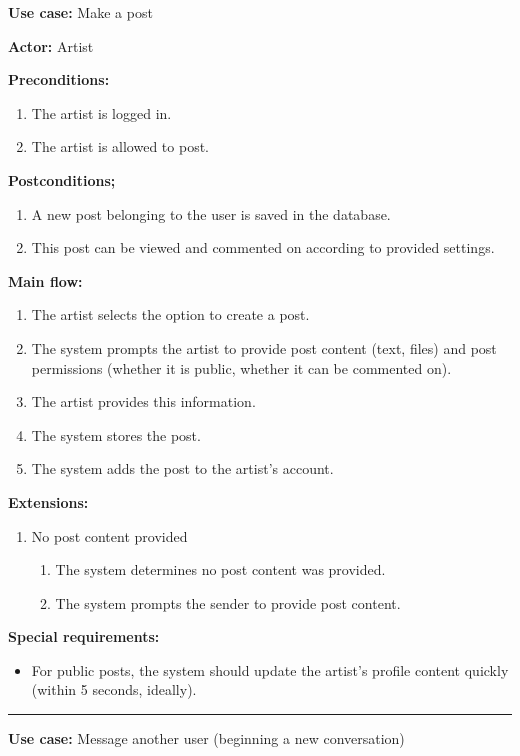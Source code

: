 \documentclass{article}
\begin{document}
{\bfseries Use case:} Make a post

{\bfseries Actor:} Artist

{\bfseries Preconditions:}
\begin{enumerate}
	\item The artist is logged in.
	\item The artist is allowed to post.
\end{enumerate}

{\bfseries Postconditions;}
\begin{enumerate}
	\item A new post belonging to the user is saved in the database.
	\item This post can be viewed and commented on according to provided settings.
\end{enumerate}

{\bfseries Main flow:}
\begin{enumerate}
	\item The artist selects the option to create a post.
	\item The system prompts the artist to provide post content (text, files) and post permissions (whether it is public, whether it can be commented on).
	\item The artist provides this information.
	\item The system stores the post.
	\item The system adds the post to the artist's account.
\end{enumerate}

{\bfseries Extensions:}
\begin{enumerate}
	\item [4a.] No post content provided
	\begin{enumerate}
		\item [4a1.] The system determines no post content was provided.
		\item [4a2.] The system prompts the sender to provide post content.
	\end{enumerate}
\end{enumerate}

{\bfseries Special requirements:}
\begin{itemize}
	\item For public posts, the system should update the artist's profile content quickly (within 5 seconds, ideally).
\end{itemize}

\hrule
\bigskip


{\bfseries Use case:} Message another user (beginning a new conversation)
\end{document}
